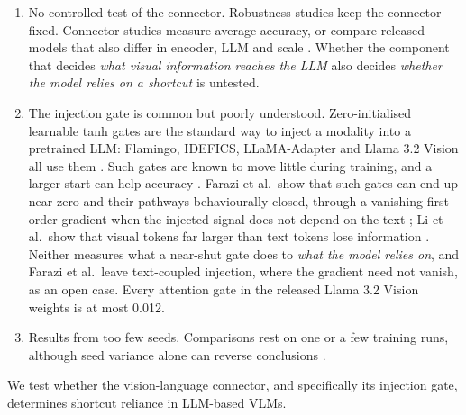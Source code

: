 \begin{enumerate}
\def\labelenumi{\arabic{enumi}.}
\item
  No controlled test of the connector. Robustness studies keep the connector fixed. Connector studies measure
  average accuracy, or compare released models that also differ in encoder, LLM and scale \citep{balaji2026forget}.
  Whether the component that decides \emph{what visual information reaches the LLM} also decides \emph{whether the model
  relies on a shortcut} is untested.
\item
  The injection gate is common but poorly understood. Zero-initialised learnable tanh gates are the standard
  way to inject a modality into a pretrained LLM: Flamingo, IDEFICS, LLaMA-Adapter and Llama 3.2 Vision all use
  them \citep{alayrac2022flamingo,zhang2024llamaadapter,grattafiori2024llama3}. Such gates are known to move little
  during training, and a larger start can help accuracy \citep{lialin2023scalable,yan2026dgp}. Farazi et al.~show that such gates can
  end up near zero and their pathways behaviourally closed, through a vanishing first-order gradient when the
  injected signal does not depend on the text \citep{farazi2026gate}; Li et al.~show that visual tokens far larger than
  text tokens lose information \citep{li2025unseen}. Neither measures what a near-shut gate does to \emph{what the model
  relies on}, and Farazi et al.~leave text-coupled injection, where the gradient need not vanish, as an open case. Every attention gate in the released Llama 3.2 Vision weights is at most 0.012.
\item
  Results from too few seeds. Comparisons rest on one or a few training runs, although seed variance alone
  can reverse conclusions \citep{henderson2018matters,bouthillier2021variance}.
\end{enumerate}

We test whether the vision-language connector, and specifically its injection gate, determines shortcut reliance
in LLM-based VLMs.

